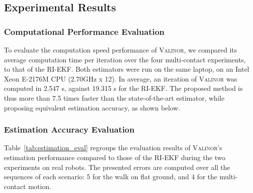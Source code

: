 \documentclass{IJCAS}
\begin{document}
\subsection{Experimental Results}

\subsubsection{Computational Performance Evaluation}\label{subsec:computation_time}

To evaluate the computation speed performance of {\scshape Valinor}, we compared its average computation time per iteration over the four multi-contact experiments, to that of the RI-EKF. Both estimators were run on the same laptop, on an Intel Xeon E-2176M CPU (2.70GHz x 12). In average, an iteration of {\scshape Valinor} was computed in 2.547 \textmu s, against 19.315 \textmu s for the RI-EKF. The proposed method is thus more than 7.5 times faster than the state-of-the-art estimator, while proposing equivalent estimation accuracy, as shown below.

\subsubsection{Estimation Accuracy Evaluation}

Table~\ref{tab:estimation_eval} regroups the evaluation results of {\scshape Valinor}'s estimation performance compared to those of the RI-EKF during the two experiments on real robots.
The presented errors are computed over all the sequences of each scenario: 5 for the walk on flat ground, and 4 for the multi-contact motion.
\end{document}
